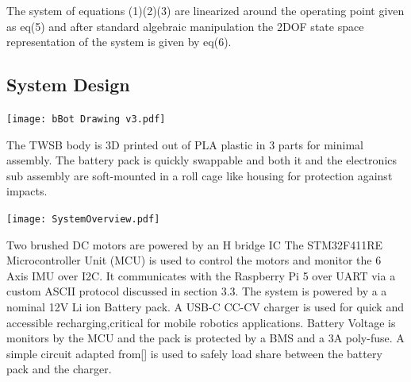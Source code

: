     The system of equations (1)(2)(3) are linearized around the operating point given as eq(5) and after standard algebraic manipulation the 
    2DOF state space representation of the system is given by eq(6).
   
    \pagebreak{}

    \subsection{System Design}
        \texttt{[image: bBot Drawing v3.pdf]}

        The TWSB body is 3D printed out of PLA plastic in 3 parts for minimal assembly.
        The battery pack is quickly swappable and both it and the electronics sub assembly 
        are soft-mounted in a roll cage like housing for protection against impacts. 

        \texttt{[image: SystemOverview.pdf]}

        Two brushed DC motors are powered by an H bridge IC 
        The STM32F411RE Microcontroller Unit (MCU) is used to control the 
        motors and monitor the 6 Axis IMU over I2C. It communicates with the 
        Raspberry Pi 5 over UART via a custom ASCII protocol discussed in section 3.3. 
        The system is powered by a a nominal 12V Li ion Battery pack. A USB-C CC-CV charger is used for quick 
        and accessible recharging,critical for mobile robotics applications. Battery Voltage is monitors by the MCU
        and the pack is protected by a BMS and a 3A poly-fuse.
        A simple circuit adapted from[] is used to safely load share between the battery pack and the charger.


        \pagebreak{}
